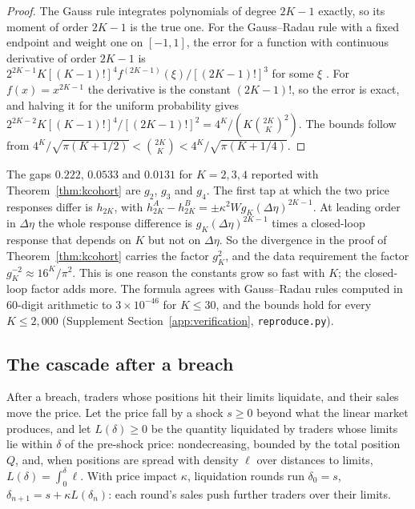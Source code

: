 \documentclass[12pt]{article}
\theoremstyle{definition}
\theoremstyle{remark}
\begin{document}
\begin{proof}
The Gauss rule integrates polynomials of degree $2K-1$ exactly, so its moment of order $2K-1$ is the true one. For the Gauss--Radau rule with a fixed endpoint and weight one on $[-1,1]$, the error for a function with continuous derivative of order $2K-1$ is $2^{2K-1}K[(K-1)!]^4f^{(2K-1)}(\xi)/[(2K-1)!]^3$ for some $\xi$ \citep[25.4.31]{abramowitz1964}. For $f(x)=x^{2K-1}$ the derivative is the constant $(2K-1)!$, so the error is exact, and halving it for the uniform probability gives $2^{2K-2}K[(K-1)!]^4/[(2K-1)!]^2=4^K/(K\binom{2K}{K}^2)$. The bounds follow from $4^K/\sqrt{\pi(K+1/2)}<\binom{2K}{K}<4^K/\sqrt{\pi(K+1/4)}$.
\end{proof}

The gaps $0.222$, $0.0533$ and $0.0131$ for $K=2,3,4$ reported with Theorem~\ref{thm:kcohort} are $g_2$, $g_3$ and $g_4$. The first tap at which the two price responses differ is $h_{2K}$, with $h^A_{2K}-h^B_{2K}=\pm\kappa^2Wg_K(\Delta\eta)^{2K-1}$. At leading order in $\Delta\eta$ the whole response difference is $g_K(\Delta\eta)^{2K-1}$ times a closed-loop response that depends on $K$ but not on $\Delta\eta$. So the divergence in the proof of Theorem~\ref{thm:kcohort} carries the factor $g_K^2$, and the data requirement the factor $g_K^{-2}\approx16^K/\pi^2$. This is one reason the constants grow so fast with $K$; the closed-loop factor adds more. The formula agrees with Gauss--Radau rules computed in 60-digit arithmetic to $3\times10^{-46}$ for $K\le30$, and the bounds hold for every $K\le2{,}000$ (Supplement Section~\ref{app:verification}, \nolinkurl{reproduce.py}).

\subsection{The cascade after a breach}

After a breach, traders whose positions hit their limits liquidate, and their sales move the price. Let the price fall by a shock $s\ge0$ beyond what the linear market produces, and let $L(\delta)\ge0$ be the quantity liquidated by traders whose limits lie within $\delta$ of the pre-shock price: nondecreasing, bounded by the total position $Q$, and, when positions are spread with density $\ell$ over distances to limits, $L(\delta)=\int_0^\delta\ell$. With price impact $\kappa$, liquidation rounds run $\delta_0=s$, $\delta_{n+1}=s+\kappa L(\delta_n)$: each round's sales push further traders over their limits.
\end{document}

